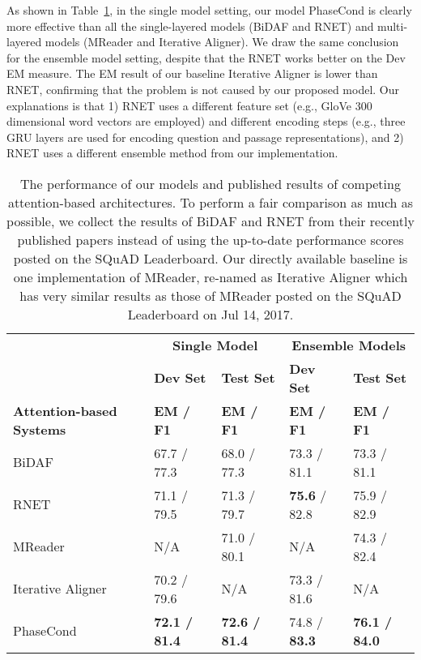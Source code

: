 \documentclass{article} \usepackage{arxiv, times}
\begin{document}
As shown in Table~\ref{tab:competing-approaches}, in the single model setting, our model PhaseCond is clearly more effective than all the single-layered models (BiDAF and RNET) and multi-layered models (MReader and Iterative Aligner). We draw the same conclusion for the ensemble model setting, despite that the RNET works better on the Dev EM measure. The EM result of our baseline Iterative Aligner is lower than RNET, confirming that the problem is not caused by our proposed model. Our explanations is that 1) RNET uses a different feature set (e.g., GloVe 300 dimensional word vectors are employed) and different encoding steps (e.g., three GRU layers are used for encoding question and passage representations), and 2) RNET uses a different ensemble method from our implementation.
\begin{table}[t]
\caption{The performance of our models and published results of competing attention-based architectures. To perform a fair comparison as much as possible, we collect the results of BiDAF \citep{seo2016bidirectional} and RNET \citep{wang2017gated} from their recently published papers instead of using the up-to-date performance scores posted on the SQuAD Leaderboard. Our directly available baseline is one implementation of MReader, re-named as Iterative Aligner which has very similar results as those of MReader \citep{hureinforced} posted on the SQuAD Leaderboard on Jul 14, 2017.}
\label{tab:competing-approaches}
\begin{center}
\begin{tabular}{lllll}
\hline
 & \multicolumn{2}{c}{\bf Single Model} & \multicolumn{2}{c}{\bf Ensemble Models} \\
 & \bf Dev Set& \bf Test Set &\bf Dev Set& \bf Test Set\\
\bf Attention-based Systems &\bf EM / F1 & \bf EM / F1&\bf EM / F1 & \bf EM / F1\\\hline
BiDAF \citep{seo2016bidirectional}   &67.7 / 77.3& 68.0 / 77.3&  73.3 / 81.1 & 73.3 / 81.1\\
RNET \citep{wang2017gated}     &71.1 / 79.5&71.3 / 79.7& {\bf 75.6} / 82.8 &  75.9 / 82.9\\
MReader \citep{hureinforced}    &  N/A   &  71.0 / 80.1 & N/A & 74.3 / 82.4 \\
Iterative Aligner \citep{hureinforced}  &  70.2	/ 79.6  &  N/A & 73.3 / 81.6 & N/A \\
PhaseCond  & \bf 72.1 / 81.4& \bf 72.6 / 81.4& 74.8 / {\bf 83.3} & \bf 76.1 / 84.0\\\hline
\end{tabular}
\end{center}
\end{table}
\end{document}
